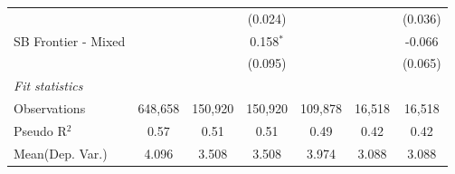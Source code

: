 \begin{tabular}{lcccccc}
                        &               &               & (0.024)       &               &               & (0.036)\\   
   SB Frontier - Mixed  &               &               & 0.158$^{*}$   &               &               & -0.066\\   
                        &               &               & (0.095)       &               &               & (0.065)\\   
   \midrule
   \emph{Fit statistics}\\
   Observations         & 648,658       & 150,920       & 150,920       & 109,878       & 16,518        & 16,518\\  
   Pseudo R$^2$         & 0.57          & 0.51          & 0.51          & 0.49          & 0.42          & 0.42\\  
Mean(Dep. Var.) & 4.096 & 3.508 & 3.508 & 3.974 & 3.088 & 3.088 \\
   

\end{tabular}
